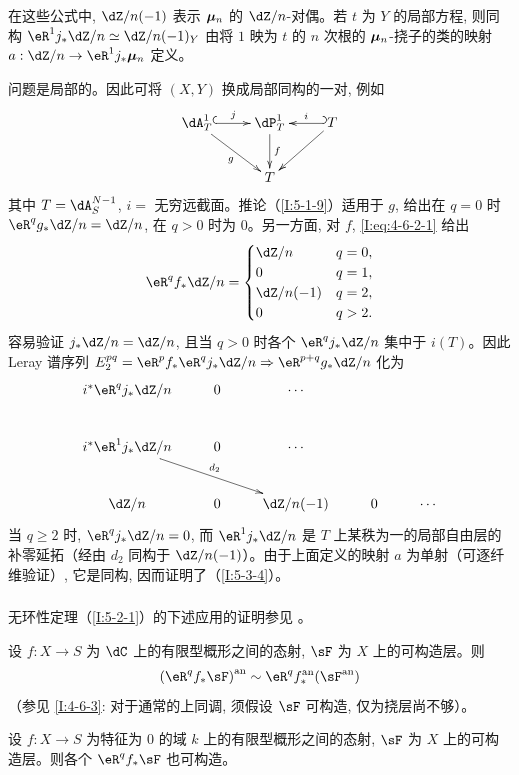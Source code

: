 在这些公式中, $\dZ/n(-1)$ 表示 ${\bm\mu}_n$ 的 $\dZ/n$-对偶。若 $t$ 为 $Y$ 的局部方程, 则同构 $\eR^1j_*\dZ/n\simeq\dZ/n(-1)_Y$ 由将 $1$ 映为 $t$ 的 $n$ 次根的 ${\bm\mu}_n$-挠子的类的映射 $a:\dZ/n\to\eR^1j_*\dmu_n$ 定义。

问题是局部的。因此可将 $(X,Y)$ 换成局部同构的一对, 例如
\[\xymatrix{
  \dA_T^1 \ar@{^{(}->}[r]^-j \ar[dr]_-g
    & \dP_T^1 \ar[d]^-f
    & \ar@{_{(}->}[l]_-i T \ar[dl] \\
  & T
}\]
其中 $T=\dA_S^{N-1}$, $i=$ 无穷远截面。推论（\ref{I:5-1-9}）适用于 $g$, 给出在 $q=0$ 时 $\eR^qg_*\dZ/n=\dZ/n$, 在 $q>0$ 时为 $0$。另一方面, 对 $f$, \eqref{I:eq:4-6-2-1} 给出
\[
  \eR^q f_* \dZ/n =
  \begin{cases}
    \dZ/n & q=0,\\
    0 & q=1,\\
    \dZ/n(-1) & q=2,\\
    0 & q>2.
  \end{cases}
\]
容易验证 $j_*\dZ/n=\dZ/n$, 且当 $q>0$ 时各个 $\eR^qj_*\dZ/n$ 集中于 $i(T)$。因此 Leray 谱序列 $E_2^{pq}=\eR^pf_*\eR^qj_*\dZ/n\Rightarrow\eR^{p+q}g_*\dZ/n$ 化为
\[\xymatrix{
  i^* \eR^q j_* \dZ/n & 0 & \cdots \\
  i^* \eR^1 j_* \dZ/n \ar[drr]^-{d_2} & 0 & \cdots \\
  \dZ/n              & 0 & \dZ/n(-1) & 0 & \cdots
}\]
当 $q\geqslant2$ 时, $\eR^qj_*\dZ/n=0$, 而 $\eR^1j_*\dZ/n$ 是 $T$ 上某秩为一的局部自由层的补零延拓（经由 $d_2$ 同构于 $\dZ/n(-1)$）。由于上面定义的映射 $a$ 为单射（可逐纤维验证）, 它是同构, 因而证明了（\ref{I:5-3-4}）。

\subsubsection{}\label{I:5-3-5}

无环性定理（\ref{I:5-2-1}）的下述应用的证明参见 \cite[XVI.4,5]{sga4}。

\begin{theorem}\label{I:5-3-6} %
设 $f:X\to S$ 为 $\dC$ 上的有限型概形之间的态射, $\sF$ 为 $X$ 上的可构造层。则
\[
  \an{(\eR^q f_*\sF)} \sim \eR^q \an f_* (\an\sF)
\]
（参见 \ref{I:4-6-3}: 对于通常的上同调, 须假设 $\sF$ 可构造, 仅为挠层尚不够）。
\end{theorem}

\begin{theorem}\label{I:5-3-7} %
设 $f:X\to S$ 为特征为 $0$ 的域 $k$ 上的有限型概形之间的态射, $\sF$ 为 $X$ 上的可构造层。则各个 $\eR^qf_*\sF$ 也可构造。
\end{theorem}

